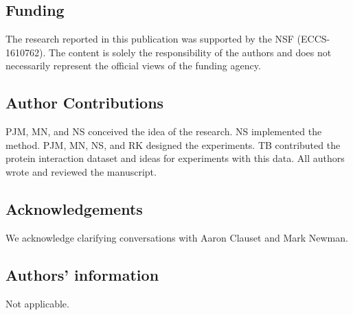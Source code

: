 \subsection{Funding}
The research reported in this publication was supported by the NSF (ECCS-1610762). The content is solely the responsibility of the authors and does not necessarily represent the official views of the funding agency.

\subsection{Author Contributions}
PJM, MN, and NS conceived the idea of the research. NS implemented the method. PJM, MN, NS, and RK designed the experiments. TB contributed the protein interaction dataset and ideas for experiments with this data. All authors wrote and reviewed the manuscript. 

\subsection{Acknowledgements}
We acknowledge clarifying conversations with Aaron Clauset and Mark Newman. 

\subsection{Authors' information}
Not applicable. 


  
  





